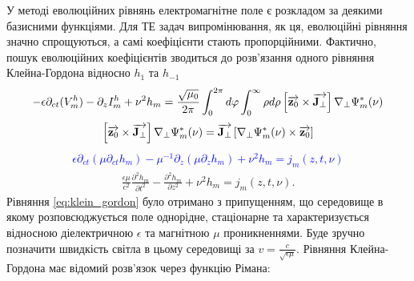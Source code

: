 У методі еволюційних рівнянь електромагнітне поле є розкладом за 
деякими базисними функціями. Для ТЕ задач випромінювання, як ця, еволюційні 
рівняння значно спрощуються, а самі коефіцієнти стають пропорційними.
Фактично, пошук еволюційних коефіцієнтів зводиться до розв'язання одного
рівняння Клейна-Гордона відносно $ h_1 $ та $ h_{-1} $
%
\textcolor{blue} { \begin{equation*} \begin{aligned}
- \epsilon \partial_{ct} (V_m^h) - \partial_z I_m^h + \nu^2 h_m = 
\frac{\sqrt{\mu_0}}{2 \pi} \int_0^{2\pi} d \varphi 
\int_0^{\infty} \rho d \rho \left[ \overrightarrow{\mathbf z_0} \times \overrightarrow{\mathbf J_\perp} \right]
\nabla_\perp \Psi_m^* (\nu) 
\end{aligned} \end{equation*} }
%
\textcolor{blue} { \begin{equation*} \begin{aligned}
\left[ \overrightarrow{\mathbf z_0} \times \overrightarrow{\mathbf J_\perp} \right] \nabla_\perp \Psi_m^* (\nu) =
\overrightarrow{\mathbf J_\perp} \left[ \nabla_\perp \Psi_m^* (\nu) \times \overrightarrow{\mathbf z_0} \right]
\end{aligned} \end{equation*} }
%
\textcolor{blue} { \begin{equation*} \begin{aligned}
\epsilon \partial_{ct} \left( \mu \partial_{ct} h_m \right) -
\mu^{-1} \partial_z \left( \mu  \partial_z h_m \right) + 
\nu^2 h_m = j_m (z,t,\nu)
\end{aligned} \end{equation*} }
%
\begin{equation} \begin{aligned} \label{eq:klein_gordon}
\frac{\epsilon \mu}{c^2} \frac{\partial^2 h_m}{\partial t^2} - 
\frac{\partial^2 h_m}{\partial z^2} + \nu^2 h_m = j_m (z,t,\nu).
\end{aligned} \end{equation}
%
Рівняння \eqref{eq:klein_gordon} було отримано з припущенням, що середовище 
в якому розповсюджується поле однорідне, стаціонарне та характеризується 
відносною діелектричною $ \epsilon $ та магнітною $ \mu $ проникненнями.
Буде зручно позначити швидкість світла в цьому середовищі за 
$ v = \frac{c}{\sqrt{\epsilon \mu}} $. Рівняння Клейна-Гордона
має відомий розв'язок через функцію Рімана:

